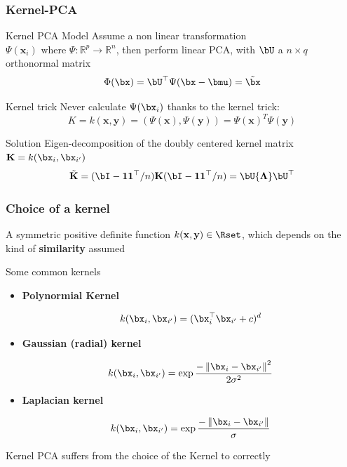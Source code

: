 \documentclass{beamer}\usepackage[]{graphicx}\usepackage[]{color}
\begin{document}
\begin{frame}
  \frametitle{Kernel-PCA}

  \begin{block}{Kernel PCA Model}
    Assume a non linear transformation $ \Psi(\mathbf{x}_i) \text{ where } \Psi : \mathbb{R}^p \to \mathbb{R}^n$,  then perform linear PCA, with $\bU$ a \alert{\bf $n\times q$} orthonormal matrix
    \[
      \Phi(\bx) = \bU^\top \Psi(\bx-\bmu) = \tilde\bx
    \]
  \end{block}

  \begin{block}{Kernel trick}
    Never calculate  $\Psi(\bx_i)$ thanks to the kernel trick:
    \[K = k(\mathbf{x},\mathbf{y}) = (\Psi(\mathbf{x}),\Psi(\mathbf{y})) = \Psi(\mathbf{x})^T\Psi(\mathbf{y}) \]
  \end{block}

  \begin{block}{Solution}
    Eigen-decomposition of the doubly centered kernel matrix $\mathbf{K} = k(\bx_i, \bx_{i'})$ 
    \[\tilde{\mathbf{K}} = 
    (\bI - \mathbf{1}\mathbf{1}^\top/n) \mathbf{K} (\bI - \mathbf{1}\mathbf{1}^\top/n) = \bU {\boldsymbol\Lambda} \bU^\top \]
  \end{block}

\end{frame}

\begin{frame}[fragile]
  \frametitle{Choice of a kernel} 

  A symmetric positive definite function $k(\mathbf{x},\mathbf{y}) \in \Rset$, which depends on the kind of \alert{\bf similarity} assumed

\begin{block}{Some common kernels}

\begin{itemize}
\item \alert{\bf Polynormial Kernel }

\[ k(\bx_i,\bx_{i'}) = (\bx_{i}^\top \bx_{i'} + c)^d \]

\item  \alert{\bf Gaussian (radial) kernel}

\[k(\bx_i,\bx_{i'}) = \exp{\frac {-\left\|\bx_i - \bx_{i'} \right\|^2}{2\sigma^2}}\]

\item  \alert{\bf Laplacian kernel}

\[k(\bx_i,\bx_{i'}) = \exp{\frac {-\left\|\bx_i - \bx_{i'} \right\|}{\sigma}}\]

\end{itemize}
\end{block}

\rsa Kernel PCA suffers from the choice of the Kernel to correctly

\end{frame}
\end{document}
